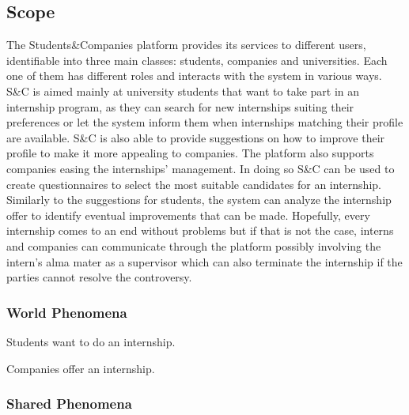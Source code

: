 \subsection{Scope}
The Students\&Companies platform provides its services to different users, identifiable into three main classes: students,  companies and universities. Each one of them has different roles and interacts with the system in various ways.
S\&C is aimed mainly at university students that want to take part in an internship program, as they can search for new internships suiting their preferences or let the system inform them when internships matching their profile are available. S\&C is also able to provide suggestions on how to improve their profile to make it more appealing to companies.
The platform also supports companies easing the internships’ management. In doing so S\&C can be used to create questionnaires to select the most suitable candidates for an internship. Similarly to the suggestions for students, the system can analyze the internship offer to identify eventual improvements that can be made.
Hopefully, every internship comes to an end without problems but if that is not the case, interns and companies can communicate through the platform possibly involving the intern’s alma mater as a supervisor which can also terminate the internship if the parties cannot resolve the controversy.
\subsubsection{World Phenomena}
\begin{w-phenomena}
    \item Students want to do an internship.
    \item Companies offer an internship.
\end{w-phenomena}
\subsubsection{Shared Phenomena}
